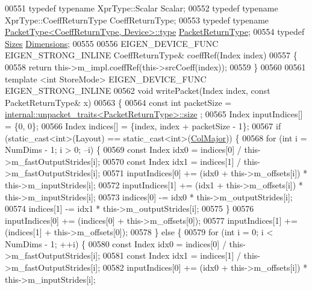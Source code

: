 \begin{DoxyCode}
00551   \textcolor{keyword}{typedef} \textcolor{keyword}{typename} XprType::Scalar Scalar;
00552   \textcolor{keyword}{typedef} \textcolor{keyword}{typename} XprType::CoeffReturnType CoeffReturnType;
00553   \textcolor{keyword}{typedef} \textcolor{keyword}{typename} \hyperlink{group___sparse_core___module}{PacketType<CoeffReturnType, Device>::type} 
      \hyperlink{group___sparse_core___module}{PacketReturnType};
00554   \textcolor{keyword}{typedef} \hyperlink{struct_eigen_1_1_sizes}{Sizes} \hyperlink{struct_eigen_1_1_sizes}{Dimensions};
00555 
00556   EIGEN\_DEVICE\_FUNC EIGEN\_STRONG\_INLINE CoeffReturnType& coeffRef(Index index)
00557   \{
00558     \textcolor{keywordflow}{return} this->m\_impl.coeffRef(this->srcCoeff(index));
00559   \}
00560 
00561   \textcolor{keyword}{template} <\textcolor{keywordtype}{int} StoreMode> EIGEN\_DEVICE\_FUNC EIGEN\_STRONG\_INLINE
00562   \textcolor{keywordtype}{void} writePacket(Index index, \textcolor{keyword}{const} PacketReturnType& x)
00563   \{
00564     \textcolor{keyword}{const} \textcolor{keywordtype}{int} packetSize = \hyperlink{struct_eigen_1_1internal_1_1unpacket__traits}{internal::unpacket\_traits<PacketReturnType>::size}
      ;
00565     Index inputIndices[] = \{0, 0\};
00566     Index indices[] = \{index, index + packetSize - 1\};
00567     \textcolor{keywordflow}{if} (static\_cast<int>(Layout) == static\_cast<int>(\hyperlink{group__enums_ggaacded1a18ae58b0f554751f6cdf9eb13a0cbd4bdd0abcfc0224c5fcb5e4f6669a}{ColMajor})) \{
00568       \textcolor{keywordflow}{for} (\textcolor{keywordtype}{int} i = NumDims - 1; i > 0; --i) \{
00569         \textcolor{keyword}{const} Index idx0 = indices[0] / this->m\_fastOutputStrides[i];
00570         \textcolor{keyword}{const} Index idx1 = indices[1] / this->m\_fastOutputStrides[i];
00571         inputIndices[0] += (idx0 + this->m\_offsets[i]) * this->m\_inputStrides[i];
00572         inputIndices[1] += (idx1 + this->m\_offsets[i]) * this->m\_inputStrides[i];
00573         indices[0] -= idx0 * this->m\_outputStrides[i];
00574         indices[1] -= idx1 * this->m\_outputStrides[i];
00575       \}
00576       inputIndices[0] += (indices[0] + this->m\_offsets[0]);
00577       inputIndices[1] += (indices[1] + this->m\_offsets[0]);
00578     \} \textcolor{keywordflow}{else} \{
00579       \textcolor{keywordflow}{for} (\textcolor{keywordtype}{int} i = 0; i < NumDims - 1; ++i) \{
00580         \textcolor{keyword}{const} Index idx0 = indices[0] / this->m\_fastOutputStrides[i];
00581         \textcolor{keyword}{const} Index idx1 = indices[1] / this->m\_fastOutputStrides[i];
00582         inputIndices[0] += (idx0 + this->m\_offsets[i]) * this->m\_inputStrides[i];

\end{DoxyCode}
